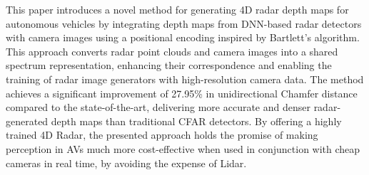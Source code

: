 This paper introduces a novel method for generating 4D radar depth maps for autonomous vehicles by integrating depth maps from DNN-based radar detectors with camera images using a positional encoding inspired by Bartlett's algorithm. This approach converts radar point clouds and camera images into a shared spectrum representation, enhancing their correspondence and enabling the training of radar image generators with high-resolution camera data. The method achieves a significant improvement of 27.95\% in unidirectional Chamfer distance compared to the state-of-the-art, delivering more accurate and denser radar-generated depth maps than traditional CFAR detectors. By offering a highly trained 4D Radar, the presented approach holds the promise of making perception in AVs much more cost-effective when used in conjunction with cheap cameras in real time, by avoiding the expense of Lidar.

\vspace{-3px}






